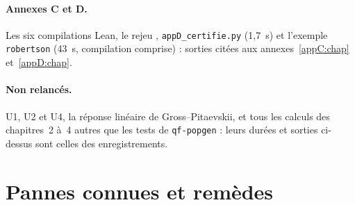 \paragraph{Annexes C et D.} Les six compilations Lean, le rejeu , \texttt{appD\_certifie.py} (1,7~s) et
l'exemple \texttt{robertson} (43~s, compilation comprise) : sorties citées aux annexes~\ref{appC:chap}
et~\ref{appD:chap}.

\paragraph{Non relancés.} U1, U2 et U4, la réponse linéaire de Gross--Pitaevskii, et tous les calculs des
chapitres~2 à~4 autres que les tests de \texttt{qf-popgen} : leurs durées et sorties ci-dessus sont celles des
enregistrements.

\section{Pannes connues et remèdes}\label{appE:sec:pannes}


